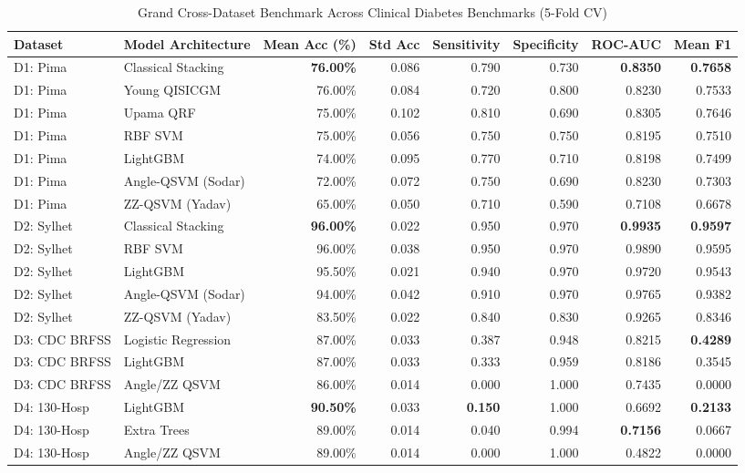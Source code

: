 \documentclass[10pt,journal,compsoc]{IEEEtran}
\begin{document}
\begin{table}[htbp]
\caption{Grand Cross-Dataset Benchmark Across Clinical Diabetes Benchmarks (5-Fold CV)}
\label{tab:master_benchmark}
\centering
\begin{tabular}{llrrrrrr}
\toprule
\textbf{Dataset} & \textbf{Model Architecture} & \textbf{Mean Acc (\%)} & \textbf{Std Acc} & \textbf{Sensitivity} & \textbf{Specificity} & \textbf{ROC-AUC} & \textbf{Mean F1} \\
\midrule
D1: Pima & Classical Stacking & \textbf{76.00\%} & 0.086 & 0.790 & 0.730 & \textbf{0.8350} & \textbf{0.7658} \\
D1: Pima & Young QISICGM & 76.00\% & 0.084 & 0.720 & 0.800 & 0.8230 & 0.7533 \\
D1: Pima & Upama QRF & 75.00\% & 0.102 & 0.810 & 0.690 & 0.8305 & 0.7646 \\
D1: Pima & RBF SVM & 75.00\% & 0.056 & 0.750 & 0.750 & 0.8195 & 0.7510 \\
D1: Pima & LightGBM & 74.00\% & 0.095 & 0.770 & 0.710 & 0.8198 & 0.7499 \\
D1: Pima & Angle-QSVM (Sodar) & 72.00\% & 0.072 & 0.750 & 0.690 & 0.8230 & 0.7303 \\
D1: Pima & ZZ-QSVM (Yadav) & 65.00\% & 0.050 & 0.710 & 0.590 & 0.7108 & 0.6678 \\
\midrule
D2: Sylhet & Classical Stacking & \textbf{96.00\%} & 0.022 & 0.950 & 0.970 & \textbf{0.9935} & \textbf{0.9597} \\
D2: Sylhet & RBF SVM & 96.00\% & 0.038 & 0.950 & 0.970 & 0.9890 & 0.9595 \\
D2: Sylhet & LightGBM & 95.50\% & 0.021 & 0.940 & 0.970 & 0.9720 & 0.9543 \\
D2: Sylhet & Angle-QSVM (Sodar) & 94.00\% & 0.042 & 0.910 & 0.970 & 0.9765 & 0.9382 \\
D2: Sylhet & ZZ-QSVM (Yadav) & 83.50\% & 0.022 & 0.840 & 0.830 & 0.9265 & 0.8346 \\
\midrule
D3: CDC BRFSS & Logistic Regression & 87.00\% & 0.033 & 0.387 & 0.948 & 0.8215 & \textbf{0.4289} \\
D3: CDC BRFSS & LightGBM & 87.00\% & 0.033 & 0.333 & 0.959 & 0.8186 & 0.3545 \\
D3: CDC BRFSS & Angle/ZZ QSVM & 86.00\% & 0.014 & 0.000 & 1.000 & 0.7435 & 0.0000 \\
\midrule
D4: 130-Hosp & LightGBM & \textbf{90.50\%} & 0.033 & \textbf{0.150} & 1.000 & 0.6692 & \textbf{0.2133} \\
D4: 130-Hosp & Extra Trees & 89.00\% & 0.014 & 0.040 & 0.994 & \textbf{0.7156} & 0.0667 \\
D4: 130-Hosp & Angle/ZZ QSVM & 89.00\% & 0.014 & 0.000 & 1.000 & 0.4822 & 0.0000 \\
\bottomrule
\end{tabular}
\end{table}
\end{document}

